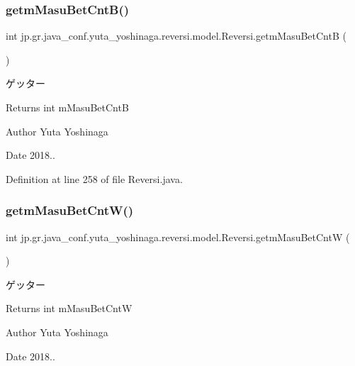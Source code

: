 \subsubsection{\texorpdfstring{getm\+Masu\+Bet\+Cnt\+B()}{getmMasuBetCntB()}}
{\footnotesize\ttfamily int jp.\+gr.\+java\+\_\+conf.\+yuta\+\_\+yoshinaga.\+reversi.\+model.\+Reversi.\+getm\+Masu\+Bet\+CntB (\begin{DoxyParamCaption}{ }\end{DoxyParamCaption})}



ゲッター 

\begin{DoxyReturn}{Returns}
int m\+Masu\+Bet\+CntB 
\end{DoxyReturn}
\begin{DoxyAuthor}{Author}
Yuta Yoshinaga 
\end{DoxyAuthor}
\begin{DoxyDate}{Date}
2018.. 
\end{DoxyDate}


Definition at line 258 of file Reversi.\+java.

\mbox{\label{classjp_1_1gr_1_1java__conf_1_1yuta__yoshinaga_1_1reversi_1_1model_1_1_reversi_a0c8bd1c479d27a1531b99baa9af52fb6}} 
\subsubsection{\texorpdfstring{getm\+Masu\+Bet\+Cnt\+W()}{getmMasuBetCntW()}}
{\footnotesize\ttfamily int jp.\+gr.\+java\+\_\+conf.\+yuta\+\_\+yoshinaga.\+reversi.\+model.\+Reversi.\+getm\+Masu\+Bet\+CntW (\begin{DoxyParamCaption}{ }\end{DoxyParamCaption})}



ゲッター 

\begin{DoxyReturn}{Returns}
int m\+Masu\+Bet\+CntW 
\end{DoxyReturn}
\begin{DoxyAuthor}{Author}
Yuta Yoshinaga 
\end{DoxyAuthor}
\begin{DoxyDate}{Date}
2018.. 
\end{DoxyDate}


